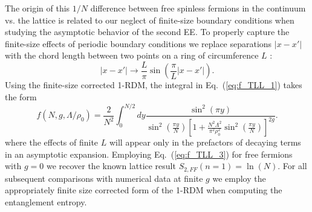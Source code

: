The origin of this $1/N$ difference between free spinless fermions in the
continuum vs. the lattice is related to our neglect of finite-size boundary
conditions when studying the asymptotic behavior of the second \ren EE.  To
properly capture the finite-size effects of periodic boundary conditions we
replace separations $\lvert x-x'\rvert$ with the chord length between two
points on a ring of circumference $L$ \cite{Cazalilla:2004}:
%
\begin{equation}
|x-x'| \rightarrow \frac{L}{\pi}\sin\left(\frac{\pi} {L}|x-x'|\right).
\end{equation}
%
Using the finite-size corrected 1-RDM, the integral in Eq.~(\ref{eq:f_TLL_1}) takes the form
%
\begin{equation}
    f(N,g,\Lambda/\rho_0)= \frac{2}{N^2}\int_{0}^{N/2} dy\frac{\sin^2(\pi
y)}{\sin^2(\frac{\pi
y}{N})\left[1+\frac{N^2\Lambda^2}{\pi^2\rho_0^2}\sin^2(\frac{\pi y}{N})\right]^{2g}}. 
\label{eq:f_TLL_3}
\end{equation}
%
where the effects of finite $L$ will appear only in the prefactors of 
decaying terms in an asymptotic expansion.  Employing Eq.~(\ref{eq:f_TLL_3})
for free fermions with $g=0$ we recover the known lattice result 
$S_{2,FF}(n=1)=\ln(N)$.  For all subsequent comparisons with numerical data at
finite $g$ we employ the appropriately finite size corrected form of the 1-RDM
when computing the \ren entanglement entropy.
%


